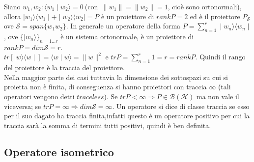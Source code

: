Siano $w_{1}, w_{2} : \langle w_{1} \mid w_{2} \rangle = 0 \ $(con $ \ \parallel w_1 \parallel = \parallel w_2 \parallel = 1 $, cioè sono ortonormali), allora $\mid w_{1} \rangle \langle w_{1} \mid + \mid w_{2} \rangle \langle w_{2} \mid =P$ è un proiettore di $rankP=2$ ed è il proiettore $P_{\mathcal{S}}$ ove $\mathcal{S}=span\lbrace w_{1}w_{2} \rbrace$. In generale un operatore della forma $P=\sum_{n=1}^{r} \mid w_{n} \rangle \langle w_{n} \mid $, ove $\lbrace \mid w_{n} \rangle \rbrace_{n=1...r}$ è un sistema ortonormale, è un proiettore di $rankP=dim \mathcal{S}=r$.\\
$tr[\mid w \rangle \langle w \mid] = \langle w \mid w \rangle = \parallel w \parallel^{2}$ e $trP=\sum_{n=1}^{r}1=r=rankP$. Quindi il rango del proiettore è la traccia del proiettore.\\
Nella maggior parte dei casi tuttavia la dimensione dei sottospazi su cui si proietta non è finita, di conseguenza si hanno proiettori con traccia $\infty$ (tali operatori vengono detti $traceless$). Se $trP< \infty \Rightarrow P\in \mathcal{B}(\mathcal{H})$ ma non vale il viceversa; se $trP= \infty \Rightarrow dim\mathcal{S}=\infty$. Un operatore si dice di classe traccia se esso per il suo dagato ha traccia finita,infatti questo è un operatore positivo per cui la traccia sarà la somma di termini tutti positivi, quindi è ben definita.


\subsection{Operatore isometrico} %

